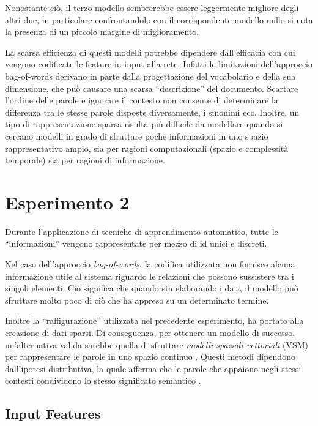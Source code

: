 Nonostante ciò, il terzo modello sembrerebbe essere leggermente migliore degli altri due, in particolare confrontandolo con il corrispondente modello nullo si nota la presenza di un piccolo margine di miglioramento.

La scarsa efficienza di questi modelli potrebbe dipendere dall'efficacia con cui vengono codificate le feature in input alla rete. 
Infatti le limitazioni dell'approccio bag-of-words derivano in parte dalla progettazione del vocabolario e della sua dimensione, che può causare una scarsa ``descrizione'' del documento. 
Scartare l'ordine delle parole e ignorare il contesto non consente di determinare la differenza tra le stesse parole disposte diversamente, i sinonimi ecc.
Inoltre, un tipo di rappresentazione sparsa risulta più difficile da modellare quando si cercano modelli in grado di sfruttare poche informazioni in uno spazio rappresentativo ampio, sia per ragioni computazionali (spazio e complessità temporale) sia per ragioni di informazione.

\section{Esperimento 2}
\label{sec:es2}

Durante l'applicazione di tecniche di apprendimento automatico, tutte le ``informazioni'' vengono rappresentate per mezzo di id unici e discreti. 

Nel caso dell'approccio \emph{bag-of-words}, la codifica utilizzata non fornisce alcuna informazione utile al sistema riguardo le relazioni che possono sussistere tra i singoli elementi. Ciò significa che quando sta elaborando i dati, il modello può sfruttare molto poco di ciò che ha appreso su un determinato termine. 

Inoltre la ``raffigurazione'' utilizzata nel precedente esperimento, ha portato alla creazione di dati sparsi. Di conseguenza, per ottenere un modello di successo, un'alternativa valida sarebbe quella di sfruttare \emph{modelli spaziali vettoriali} (VSM) per rappresentare le parole in uno spazio continuo \cite{FIXME}.
Questi metodi dipendono dall'ipotesi distributiva, la quale afferma che le parole che appaiono negli stessi contesti condividono lo stesso significato semantico \cite{FIXME}. 

\subsection{Input Features}
\label{subsec:features2}

